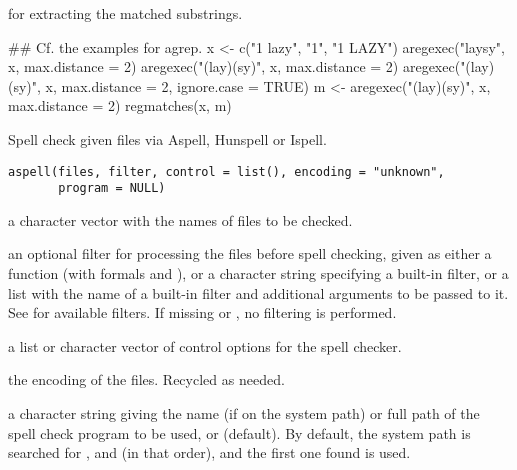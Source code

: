 %
\begin{SeeAlso}\relax
{} for extracting the matched substrings.
\end{SeeAlso}
%
\begin{Examples}
\begin{ExampleCode}
## Cf. the examples for agrep.
x <- c("1 lazy", "1", "1 LAZY")
aregexec("laysy", x, max.distance = 2)
aregexec("(lay)(sy)", x, max.distance = 2)
aregexec("(lay)(sy)", x, max.distance = 2, ignore.case = TRUE)
m <- aregexec("(lay)(sy)", x, max.distance = 2)
regmatches(x, m)
\end{ExampleCode}
\end{Examples}
%
\begin{Description}\relax
Spell check given files via Aspell, Hunspell or Ispell.
\end{Description}
%
\begin{Usage}
\begin{verbatim}
aspell(files, filter, control = list(), encoding = "unknown",
       program = NULL)
\end{verbatim}
\end{Usage}
%
\begin{Arguments}
\begin{ldescription}
\item[\code{files}] a character vector with the names of files to be checked.
\item[\code{filter}] an optional filter for processing the files before spell
checking, given as either a function (with formals  and
), or a character string specifying a built-in
filter, or a list with the name of a built-in filter and additional
arguments to be passed to it.  See  for available
filters.  If missing or , no filtering is performed.
\item[\code{control}] a list or character vector of control options for the
spell checker.
\item[\code{encoding}] the encoding of the files.  Recycled as needed.
\item[\code{program}] a character string giving the name (if on the system
path) or full path of the spell check program to be used, or
 (default).  By default, the system path is searched for
,  and  (in that
order), and the first one found is used.
\end{ldescription}
\end{Arguments}
